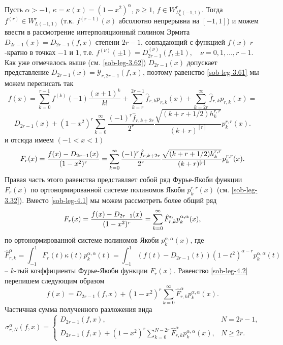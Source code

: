 Пусть $\alpha>-1$, $\kappa=\kappa(x)=(1-x^2)^\alpha$, $p\ge1$, $f\in W^r_{L^p_\kappa(-1,1)}$. Тогда $f^{(r)}\in W^r_{L(-1,1)}$ (т.к. $f^{(r-1)}(x)$ абсолютно непрерывна на $[-1,1]$) и можем ввести в рассмотрение интерполяционный полином Эрмита $D_{2r-1}(x)=D_{2r-1}(f,x)$ степени $2r-1$,  совпадающий с функцией $f(x)$ $r$-кратно в точках $-1$ и $1$, т.е. $f^{(\nu)}(\pm1)=D_{2r-1}^{(\nu)}(f,\pm1),\quad \nu=0,1,\ldots, r-1$. Как уже отмечалось выше (см. \eqref{sob-leg-3.62}) $D_{2r-1}(x)$ допускает представление $D_{2r-1}(x)=\mathcal{Y}_{r,2r-1}(f,x)$, поэтому равенство \eqref{sob-leg-3.61} мы можем переписать так
$$
f(x)=\sum_{k=0}^{r-1} f^{(k)}(-1)\frac{(x+1)^k}{k!}+ \sum_{k=r}^{2r-1}\hat f_{r,k}p_{r,k}(x)+
\sum_{k=2r}^\infty \hat f_{r,k}p_{r,k}(x)=
$$
\begin{equation*}
D_{2r-1}(x)+
(1-x^2)^r\sum_{k=0}^\infty\frac{(-1)^r\hat f_{r,k+2r}}{2^r} \frac{\sqrt{(k+r+1/2)h_k^{r,r}}}{ (k+r)^{[r]}}p_{k}^{r,r}(x).
 \end{equation*}
 и отсюда имеем $(-1<x<1)$
\begin{equation}\label{sob-leg-4.1}
F_r(x)={f(x)-D_{2r-1}(x)\over(1-x^2)^r}=
 \sum_{k=0}^\infty\frac{(-1)^r\hat f_{r,k+2r}}{2^r} \frac{\sqrt{(k+r+1/2)h_k^{r,r}}}{ (k+r)^{[r]}}p_{k}^{r,r}(x).
\end{equation}
Правая часть этого равенства представляет собой ряд Фурье-Якоби функции $F_r(x)$ по ортонормированной системе полиномов Якоби $p_k^{r,r}(x)$ (см. \eqref{sob-leg-3.32}). Вместо \eqref{sob-leg-4.1} мы можем рассмотреть более общий ряд
\begin{equation}\label{sob-leg-4.2}
F_r(x)={f(x)-D_{2r-1}(x)\over(1-x^2)^r}=
 \sum_{k=0}^\infty \hat F_{r,k}^\alpha p_{k}^{\alpha,\alpha}(x),
\end{equation}
по ортонормированной системе полиномов Якоби $p_{k}^{\alpha,\alpha}(x)$, где
\begin{equation}\label{sob-leg-4.3}
\hat F^\alpha_{r,k}=\int_{-1}^1F_r(t)\kappa(t) p_{k}^{\alpha,\alpha}(t)=\int_{-1}^1(f(t)-D_{2r-1}(t))(1-t^2)^{\alpha-r} p_{k}^{\alpha,\alpha}(t)
\end{equation}
-- $k$-тый коэффициенты Фурье-Якоби функции $F_r(x)$. Равенство \eqref{sob-leg-4.2} перепишем следующим образом
\begin{equation}\label{sob-leg-4.4}
f(x)=D_{2r-1}(f,x)+(1-x^2)^r \sum_{k=0}^\infty \hat F^\alpha_{r,k}p_{k}^{\alpha,\alpha}(x).
\end{equation}
Частичная сумма полученного разложения вида
\begin{equation}\label{sob-leg-4.5}
 \sigma_{r,N}^\alpha(f,x)=
 \begin{cases}
  D_{2r-1}(f,x),&\text{$N=2r-1$,}\\
 D_{2r-1}(f,x)+(1-x^2)^r \sum_{k=0}^{N-2r} \hat F^\alpha_{r,k}p_{k}^{\alpha,\alpha}(x),&\text{$N\ge 2r$.}
 \end{cases}
\end{equation}
